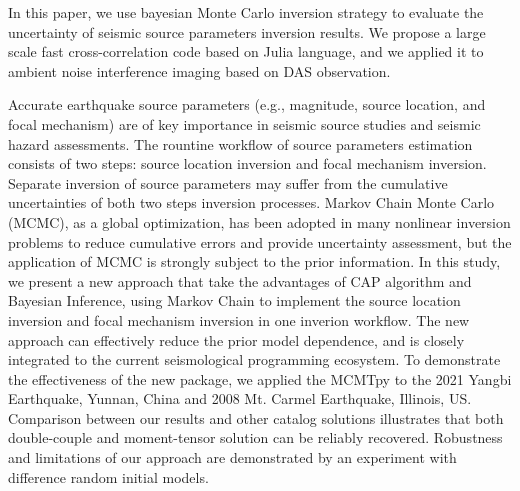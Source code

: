 \begin{abstract*}

  In this paper, we use bayesian Monte Carlo inversion strategy to evaluate the uncertainty of seismic source parameters inversion results.
  We propose a large scale fast cross-correlation code based on Julia language, and we applied it to ambient noise interference imaging based on DAS observation.

  Accurate earthquake source parameters (e.g., magnitude, source location, and focal mechanism) are of key importance in seismic source studies and seismic hazard assessments. 
  The rountine workflow of source parameters estimation consists of two steps: source location inversion and focal mechanism inversion. 
  Separate inversion of source parameters may suffer from the cumulative uncertainties of both two steps inversion processes. 
  Markov Chain Monte Carlo (MCMC), as a global optimization, 
  has been adopted in many nonlinear inversion problems to reduce cumulative errors and provide uncertainty assessment, 
  but the application of MCMC is strongly subject to the prior information. 
  In this study, we present a new approach that take the advantages of CAP algorithm and Bayesian Inference, using Markov Chain to implement the source location inversion and focal mechanism inversion in one inverion workflow. 
  The new approach can effectively reduce the prior model dependence, and is closely integrated to the current seismological programming ecosystem. 
  To demonstrate the effectiveness of the new package, we applied the MCMTpy to the 2021 Yangbi Earthquake, Yunnan, China and 2008 Mt. Carmel Earthquake, Illinois, US. 
  Comparison between our results and other catalog solutions illustrates that both double-couple and moment-tensor solution can be reliably recovered. 
  Robustness and limitations of our approach are demonstrated by an experiment with difference random initial models.


\end{abstract*}
